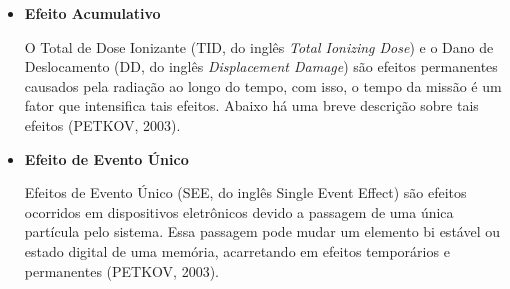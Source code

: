 \begin{itemize}
	\item \textbf{Efeito Acumulativo}
	
	O Total de Dose Ionizante (TID, do inglês \textit{Total Ionizing Dose}) e o Dano de Deslocamento (DD, do inglês \textit{Displacement Damage}) são efeitos permanentes causados pela radiação ao longo do tempo, com isso, o tempo da missão é um fator que intensifica tais efeitos. Abaixo há uma breve descrição sobre tais efeitos (PETKOV, 2003).
	
	\begin{table}[h]
		\centering
		\caption{Efeitos Acumulativos causada pela radiação espacial.}
		\label{tabela2}
	\end{table}
	
	
	\item \textbf{ Efeito de Evento Único}
	
	Efeitos de Evento Único (SEE, do inglês Single Event Effect) são efeitos ocorridos em dispositivos eletrônicos devido a passagem de uma única partícula pelo sistema. Essa passagem pode mudar um elemento bi estável ou estado digital de uma memória, acarretando em efeitos temporários e permanentes (PETKOV, 2003).
	

\end{itemize}

